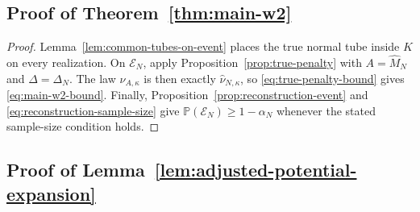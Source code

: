 \documentclass{article}
\newcommand{\Pp}{\mathbb P}
\newcommand{\cE}{\mathcal E}
\newcommand{\wideM}{\widehat M_N}
\newcommand{\whatnu}{\widehat\nu_{N,\kappa}}
\numberwithin{equation}{section}
\begin{document}
\subsection{Proof of Theorem~\ref{thm:main-w2}}



\begin{proof}
Lemma~\ref{lem:common-tubes-on-event} places the true normal tube inside
$K$ on every realization. On $\cE_N$, apply
Proposition~\ref{prop:true-penalty} with $A=\wideM$ and
$\Delta=\Delta_N$. The law $\nu_{A,\kappa}$ is then exactly $\whatnu$,
so \eqref{eq:true-penalty-bound} gives \eqref{eq:main-w2-bound}.
Finally, Proposition~\ref{prop:reconstruction-event} and
\eqref{eq:reconstruction-sample-size} give
$\Pp(\cE_N)\ge1-\alpha_N$ whenever the stated sample-size condition
holds.
\end{proof}



\subsection{Proof of Lemma~\ref{lem:adjusted-potential-expansion}}
\end{document}
